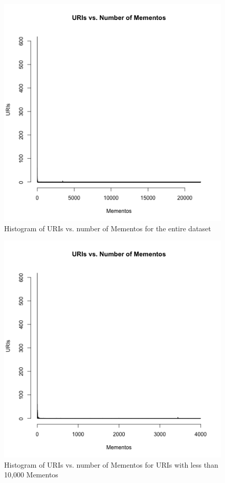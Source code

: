 \documentclass[letterpaper,11pt]{article}
\begin{document}
\begin{figure}
\includegraphics[scale=0.7]{work/q2/q2-histogram1.png}
\caption{Histogram of URIs vs. number of Mementos for the entire dataset}
\label{fig:q2histy1}
\end{figure}

\begin{figure}
\includegraphics[scale=0.7]{work/q2/q2-histogram2.png}
\caption{Histogram of URIs vs. number of Mementos for URIs with less than 10,000 Mementos}
\label{fig:q2histy2}
\end{figure}
\end{document}
